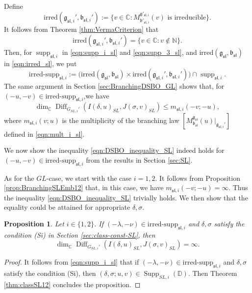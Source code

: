 \documentclass[a4paper,11pt,reqno]{amsart}
\newcommand{\frakg}{\mathfrak{g}}
\newcommand{\DD}{\mathbb{D}}
\newcommand{\0}{{\bf 0}}
\newcommand{\N}{\mathbb{N}}
\newcommand{\C}{\mathbb{C}}
\newcommand{\1}{{\bf 1}}
\newcommand{\frakb}{{\mathfrak b}}
\newcommand{\irredsupp}{\mathrm{irred\text{-}supp}}
\newcommand{\irred}{\mathrm{irred}}
\DeclareMathOperator{\supp}{supp}
\DeclareMathOperator{\Supp}{Supp}
\DeclareMathOperator{\Diff}{Diff}
\newcommand{\fraksl}{{\mathfrak{sl}}}
\newcommand{\Mbsl}{M^{\frakg_{\fraksl}}_{\frakb_{\fraksl}}}
\theoremstyle{plain}
\newtheorem{proposition}[equation]{Proposition}
\theoremstyle{definition}
\numberwithin{equation}{section}
\theoremstyle{definition}
\begin{document}
Define
\begin{equation*}
\irred(\frakg_{\fraksl,i}',\frakb_{\fraksl,i}')
:=\{v \in \C : \text{$M^{\frakg'_{\fraksl,i}}_{\frakb'_{\fraksl,i}}(v)$ is irreducible}\}.
\end{equation*}
It follows from Theorem \ref{thm:VermaCriterion} that 
\begin{equation}\label{eqn:irred_prime_sl}
\irred(\frakg_{\fraksl,i}',\frakb_{\fraksl,i}')=\{v \in \C : v \notin \N\}.
\end{equation}
Then, for $\supp_{\fraksl,i}$ in \eqref{eqn:supp_i_sl} and 
\eqref{eqn:supp_3_sl}, and 
$\irred(\frakg_{\fraksl},\frakb_{\fraksl})$ in \eqref{eqn:irred_sl}, we put
\begin{equation*}
\irredsupp_{\fraksl,i}:=
\big(\irred(\frakg_{\fraksl},\frakb_{\fraksl})\times 
\irred(\frakg_{\fraksl,i}',\frakb_{\fraksl, i}')\big) \cap \supp_{\fraksl,i}.
\end{equation*}
The same argument in Section \ref{sec:BranchingDSBO_GL} shows that,
for $(-u, -v) \in \irredsupp_{\fraksl,i}$,we have
\begin{equation}\label{eqn:DSBO_inequality_SL}
\dim_\C\Diff_{G_{SL,i}'}(I(\delta, u)_{SL}, J(\sigma,v)_{SL}) \leq m_{\fraksl,i}(-v;-u),
\end{equation}
where $m_{\fraksl,i}(v;u)$ is the multiplicity of the branching law 
$[\Mbsl(u)\vert_{\frakg_{\fraksl,i}'}]$ defined in \eqref{eqn:mult_i_sl}.

We now show the inequality \eqref{eqn:DSBO_inequality_SL} indeed holds for
$(-u, -v) \in \irredsupp_{\fraksl,i}$ from the results in Section \ref{sec:SL}.

As for the $GL$-case, we start with the case $i=1,2$.
It follows from 
Proposition \ref{prop:BranchingSLEmb12} that, in this case, we have 
$m_{\fraksl,i}(-v;-u)=\infty$. Thus the inequality \eqref{eqn:DSBO_inequality_SL}
trivially holds. We then show that the equality could be attained
for appropriate $\delta, \sigma$.


\begin{proposition}
Let $i \in \{1,2\}$. If $(-\lambda, -\nu) \in \irredsupp_{\fraksl,i}$ and $\delta, \sigma$
satisfy the condition (Si) in Section \ref{sec:class-const-SL}, then
\begin{equation*}
\dim_\C\Diff_{G_{SL,i}'}(I(\delta, u)_{SL}, J(\sigma,v)_{SL}) =\infty.
\end{equation*}
\end{proposition}

\begin{proof}
It follows from \eqref{eqn:supp_i_sl} that 
if $(-\lambda, -\nu) \in \irredsupp_{\fraksl,i}$ and $\delta, \sigma$
satisfy the condition (Si), then $(\delta,\sigma; u, v) \in \Supp_{SL,i}(\DD)$.
Then Theorem \ref{thm:classSL12} concludes the proposition.
\end{proof}
\end{document}
